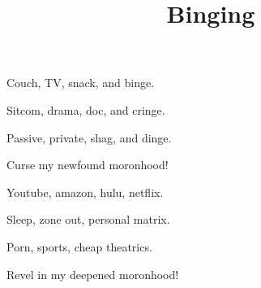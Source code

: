 \documentclass{article}
\title{Binging}
\begin{document}
 \newline

Couch, TV, snack, and binge.\newline

Sitcom, drama, doc, and cringe.\newline 

Passive, private, shag, and dinge.\newline 

Curse my newfound moronhood!\newline \newline


Youtube, amazon, hulu, netflix.\newline

Sleep, zone out, personal matrix.\newline 

Porn, sports, cheap theatrics.\newline 

Revel in my deepened moronhood!\newline 
\end{document}
